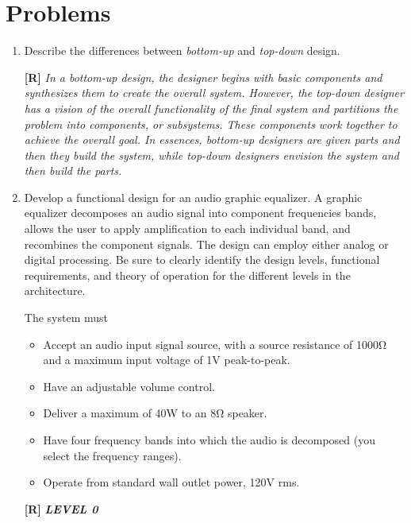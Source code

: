 \section{Problems}
\label{section:funcDecomProblems}

\begin{enumerate}
\def\labelenumi{\arabic{enumi}.}
\item
  Describe the differences between \emph{bottom-up} and \emph{top-down}
  design.

  \begin{onlysolution}
    \textbf{[R]}
    \itshape
    In a bottom-up design, the designer begins with basic components and 
    synthesizes them to create the overall system. However, the top-down 
    designer has a vision of the overall functionality of the final system 
    and partitions the problem into components, or subsystems. These components 
    work together to achieve the overall goal. In essences, bottom-up designers 
    are given parts and then they build the system, while top-down designers 
    envision the system and then build the parts.
  \end{onlysolution}
\item
  Develop a functional design for an audio graphic equalizer. A graphic
  equalizer decomposes an audio signal into component frequencies bands,
  allows the user to apply amplification to each individual band, and
  recombines the component signals. The design can employ either analog
  or digital processing. Be sure to clearly identify the design levels,
  functional requirements, and theory of operation for the different
  levels in the architecture.

The system must
\begin{itemize}
\item
  Accept an audio input signal source, with a source resistance of 1000Ω
  and a maximum input voltage of 1V peak-to-peak.
\item
  Have an adjustable volume control.
\item
  Deliver a maximum of 40W to an 8Ω speaker.
\item
  Have four frequency bands into which the audio is decomposed (you
  select the frequency ranges).
\item
  Operate from standard wall outlet power, 120V rms.
  \end{itemize}

  \begin{onlysolution}
    \textbf{[R]}
    \itshape
    \textbf{LEVEL 0}


\end{onlysolution}
\end{enumerate}
